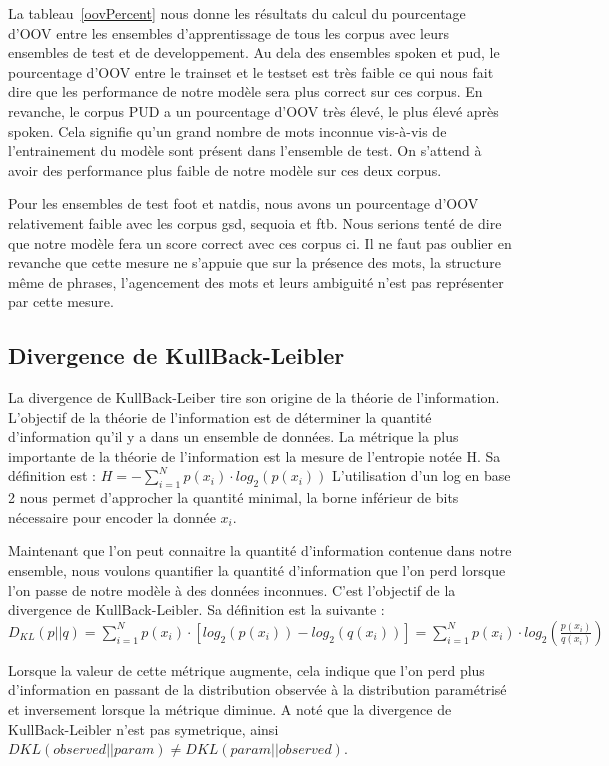 \documentclass[french, 14pt]{memoir}
\begin{document}
La tableau~\ref{oovPercent} nous donne les résultats du calcul du pourcentage d'OOV entre les ensembles d'apprentissage de tous les corpus avec leurs ensembles de test et de developpement. Au dela des ensembles spoken et pud, le pourcentage d'OOV entre le trainset et le testset est très faible ce qui nous fait dire que les performance de notre modèle sera plus correct sur ces corpus. En revanche, le corpus PUD a un pourcentage d'OOV très élevé, le plus élevé après spoken. Cela signifie qu'un grand nombre de mots inconnue vis-à-vis de l'entrainement du modèle sont présent dans l'ensemble de test. On s'attend à avoir des performance plus faible de notre modèle sur ces deux corpus. 

Pour les ensembles de test foot et natdis, nous avons un pourcentage d'OOV relativement faible avec les corpus gsd, sequoia et ftb. Nous serions tenté de dire que notre modèle fera un score correct avec ces corpus ci. Il ne faut pas oublier en revanche que cette mesure ne s'appuie que sur la présence des mots, la structure même de phrases, l'agencement des mots et leurs ambiguité n'est pas représenter par cette mesure. 

\subsection{Divergence de KullBack-Leibler}

La divergence de KullBack-Leiber tire son origine de la théorie de l'information. L'objectif de la théorie de l'information est de déterminer la quantité d'information qu'il y a dans un ensemble de données. La métrique la plus importante de la théorie de l'information est la mesure de l'entropie notée H. Sa définition est :
$H = -\sum_{i=1}^{N} p(x_i)\cdot log_2(p(x_i))$ L'utilisation d'un log en base 2 nous permet d'approcher la quantité minimal, la borne inférieur de bits nécessaire pour encoder la donnée $x_i$.

Maintenant que l'on peut connaitre la quantité d'information contenue dans notre ensemble, nous voulons quantifier la quantité d'information que l'on perd lorsque l'on passe de notre modèle à des données inconnues.
C'est l'objectif de la divergence de KullBack-Leibler. 
Sa définition est la suivante :
$D_{KL}(p||q) = \sum_{i=1}^{N} p(x_i)\cdot [log_2(p(x_i)) - log_2(q(x_i))] = \sum_{i=1}^{N} p(x_i)\cdot log_2(\frac{p(x_i)}{q(x_i)})$

Lorsque la valeur de cette métrique augmente, cela indique que l'on perd plus d'information en passant de la distribution observée à la distribution paramétrisé et inversement lorsque la métrique diminue. A noté que la divergence de KullBack-Leibler n'est pas symetrique, ainsi $DKL(observed||param) \neq DKL(param||observed)$.
\end{document}

